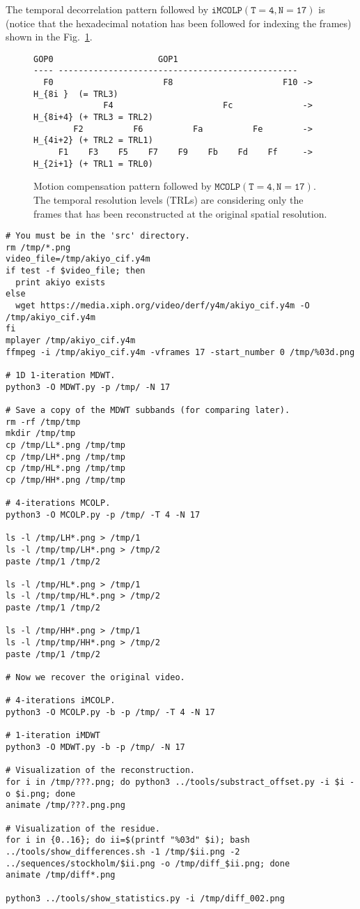 The temporal decorrelation pattern followed by $\mathtt{iMCOLP(T=4,
  N=17)}$ is (notice that the hexadecimal notation has been followed
for indexing the frames) shown in the Fig.~\ref{fig:MRVC_4_17}.

\begin{figure}
\begin{verbatim}
GOP0                     GOP1
---- ------------------------------------------------
  F0                      F8                      F10 -> H_{8i }  (= TRL3)
              F4                      Fc              -> H_{8i+4} (+ TRL3 = TRL2)
        F2          F6          Fa          Fe        -> H_{4i+2} (+ TRL2 = TRL1)
     F1    F3    F5    F7    F9    Fb    Fd    Ff     -> H_{2i+1} (+ TRL1 = TRL0)
\end{verbatim}
\caption{Motion compensation pattern followed by $\mathtt{MCOLP(T=4,
    N=17)}$. The temporal resolution levels (TRLs) are considering
  only the frames that has been reconstructed at the original spatial
  resolution.}
\label{fig:MRVC_4_17}
\end{figure}

\begin{verbatim}
# You must be in the 'src' directory.
rm /tmp/*.png
video_file=/tmp/akiyo_cif.y4m
if test -f $video_file; then
  print akiyo exists
else
  wget https://media.xiph.org/video/derf/y4m/akiyo_cif.y4m -O /tmp/akiyo_cif.y4m
fi
mplayer /tmp/akiyo_cif.y4m
ffmpeg -i /tmp/akiyo_cif.y4m -vframes 17 -start_number 0 /tmp/%03d.png

# 1D 1-iteration MDWT.
python3 -O MDWT.py -p /tmp/ -N 17

# Save a copy of the MDWT subbands (for comparing later).
rm -rf /tmp/tmp
mkdir /tmp/tmp
cp /tmp/LL*.png /tmp/tmp
cp /tmp/LH*.png /tmp/tmp
cp /tmp/HL*.png /tmp/tmp
cp /tmp/HH*.png /tmp/tmp

# 4-iterations MCOLP.
python3 -O MCOLP.py -p /tmp/ -T 4 -N 17

ls -l /tmp/LH*.png > /tmp/1
ls -l /tmp/tmp/LH*.png > /tmp/2
paste /tmp/1 /tmp/2

ls -l /tmp/HL*.png > /tmp/1
ls -l /tmp/tmp/HL*.png > /tmp/2
paste /tmp/1 /tmp/2

ls -l /tmp/HH*.png > /tmp/1
ls -l /tmp/tmp/HH*.png > /tmp/2
paste /tmp/1 /tmp/2

# Now we recover the original video.

# 4-iterations iMCOLP.
python3 -O MCOLP.py -b -p /tmp/ -T 4 -N 17

# 1-iteration iMDWT
python3 -O MDWT.py -b -p /tmp/ -N 17

# Visualization of the reconstruction.
for i in /tmp/???.png; do python3 ../tools/substract_offset.py -i $i -o $i.png; done
animate /tmp/???.png.png

# Visualization of the residue.
for i in {0..16}; do ii=$(printf "%03d" $i); bash ../tools/show_differences.sh -1 /tmp/$ii.png -2 ../sequences/stockholm/$ii.png -o /tmp/diff_$ii.png; done
animate /tmp/diff*.png

python3 ../tools/show_statistics.py -i /tmp/diff_002.png
\end{verbatim}

